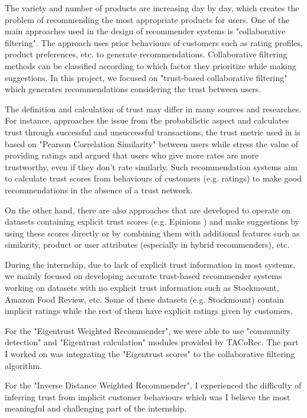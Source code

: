 The variety and number of products are increasing day by day, which creates the problem of recommending the most appropriate products for users. One of the main approaches used in the design of recommender systems is "collaborative filtering". The approach uses prior behaviours of customers such as rating profiles, product preferences, etc. to generate recommendations. Collaborative filtering methods can be classified according to which factor they prioritize while making suggestions. In this project, we focused on "trust-based collaborative filtering" which generates recommendations considering the trust between users. 

The definition and calculation of trust may differ in many sources and researches. For instance, \cite{Eigentrust} approaches the issue from the probabilistic aspect and calculates trust through successful and unsuccessful transactions, the trust metric used in \cite{papagelis_article} is based on "Pearson Correlation Similarity" between users while \cite{lathia_article} stress the value of providing ratings and argued that users who give more rates are more trustworthy, even if they don't rate similarly. Such recommendation systems aim to calculate trust scores from behaviours of customers (e.g. ratings) to make good recommendations in the absence of a trust network.

On the other hand, there are also approaches\cite{massa_article} that are developed to operate on datasets containing explicit trust scores (e.g. Epinions \cite{Epinions}) and make suggestions by using these scores directly or by combining them with additional features such as similarity, product or user attributes (especially in hybrid recommenders), etc. 

During the internship, due to lack of explicit trust information in most systems, we mainly focused on developing accurate trust-based recommender systems working on datasets with no explicit trust information such as Stockmount, Amazon Food Review, etc. Some of these datasets (e.g. Stockmount) contain implicit ratings while the rest of them have explicit ratings given by customers.

For the "Eigentrust Weighted Recommender", we were able to use "community detection" and "Eigentrust calculation" modules provided by TACoRec. The part I worked on was integrating the "Eigentrust scores" to the collaborative filtering algorithm. 

For the "Inverse Distance Weighted Recommender", I experienced the difficulty of inferring trust from implicit customer behaviours which was I believe the most meaningful and challenging part of the internship.
